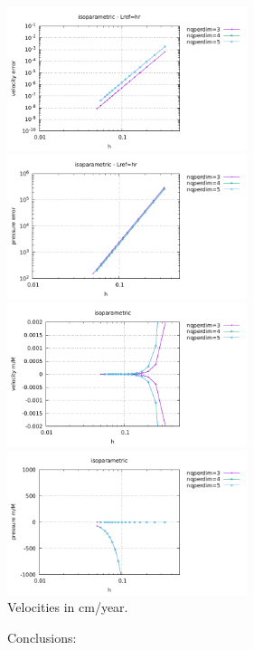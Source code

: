 \begin{center}
\includegraphics[width=7cm]{python_codes/fieldstone_133/results/bench3/ISO_Lref_hr/errors_v.pdf}
\includegraphics[width=7cm]{python_codes/fieldstone_133/results/bench3/ISO_Lref_hr/errors_p.pdf}\\
\includegraphics[width=7cm]{python_codes/fieldstone_133/results/bench3/ISO_Lref_hr/vel_stats.pdf}
\includegraphics[width=7cm]{python_codes/fieldstone_133/results/bench3/ISO_Lref_hr/press_stats.pdf}\\
{\captionfont Velocities in cm/year.}
\end{center}

Conclusions:

